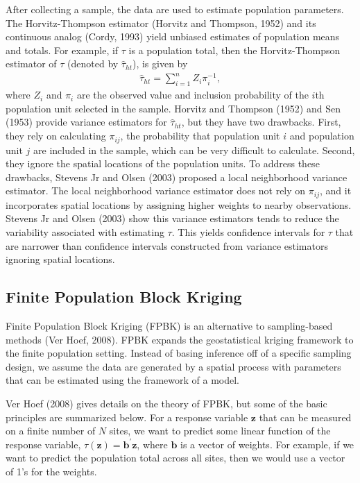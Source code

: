 \documentclass[]{elsarticle} %
\begin{document}
After collecting a sample, the data are used to estimate population
parameters. The Horvitz-Thompson estimator (Horvitz and Thompson, 1952)
and its continuous analog (Cordy, 1993) yield unbiased estimates of
population means and totals. For example, if \(\tau\) is a population
total, then the Horvitz-Thompson estimator of \(\tau\) (denoted by
\(\hat{\tau}_{ht}\)), is given by \begin{align}\label{eq:ht}
  \hat{\tau}_{ht} = \sum_{i = 1}^n Z_i \pi_i^{-1},
\end{align} where \(Z_i\) and \(\pi_i\) are the observed value and
inclusion probability of the \(i\)th population unit selected in the
sample. Horvitz and Thompson (1952) and Sen (1953) provide variance
estimators for \(\hat{\tau}_{ht}\), but they have two drawbacks. First,
they rely on calculating \(\pi_{ij}\), the probability that population
unit \(i\) and population unit \(j\) are included in the sample, which
can be very difficult to calculate. Second, they ignore the spatial
locations of the population units. To address these drawbacks, Stevens
Jr and Olsen (2003) proposed a local neighborhood variance estimator.
The local neighborhood variance estimator does not rely on \(\pi_{ij}\),
and it incorporates spatial locations by assigning higher weights to
nearby observations. Stevens Jr and Olsen (2003) show this variance
estimators tends to reduce the variability associated with estimating
\(\tau\). This yields confidence intervals for \(\tau\) that are
narrower than confidence intervals constructed from variance estimators
ignoring spatial locations.

\hypertarget{finite-population-block-kriging}{%
\subsection{Finite Population Block
Kriging}\label{finite-population-block-kriging}}

Finite Population Block Kriging (FPBK) is an alternative to
sampling-based methods (Ver Hoef, 2008). FPBK expands the geostatistical
kriging framework to the finite population setting. Instead of basing
inference off of a specific sampling design, we assume the data are
generated by a spatial process with parameters that can be estimated
using the framework of a model.

Ver Hoef (2008) gives details on the theory of FPBK, but some of the
basic principles are summarized below. For a response variable
\(\mathbf{z}\) that can be measured on a finite number of \(N\) sites,
we want to predict some linear function of the response variable,
\(\tau(\mathbf{z}) = \mathbf{b}^\prime \mathbf{z}\), where
\(\mathbf{b}\) is a vector of weights. For example, if we want to
predict the population total across all sites, then we would use a
vector of 1's for the weights.
\end{document}
